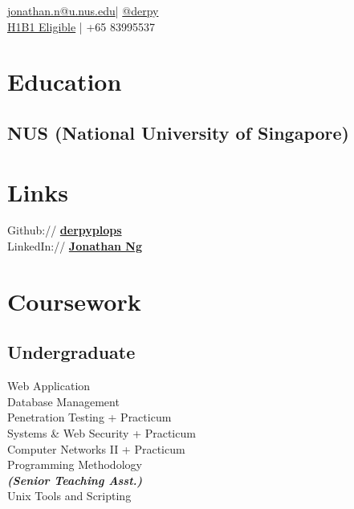 \documentclass[]{deedy-resume-openfont}
\begin{document}
%
%
\lastupdated

%
%
 { \href{mailto:jonathan.n@u.nus.edu}{jonathan.n@u.nus.edu}| \href{http://t.me/derpy/}{@derpy}\\
\href{http://www.h1b1.com/practices/h-1b1-visa-for-chileans-singaporeans/}{H1B1 Eligible}
| +65 83995537
\\
}

%
%

\begin{minipage}[t]{0.33\textwidth}


\section{Education} 

\subsection{NUS (National University of Singapore)}
\sectionsep


\section{Links} 
Github:// \href{https://github.com/derpyplops}{\bf derpyplops} \\
LinkedIn://  \href{https://www.linkedin.com/in/jonathan-ng-7061a3162/}{\bf Jonathan Ng} \\


\section{Coursework}

\subsection{Undergraduate}
Web Application \\
Database Management \\
Penetration Testing + Practicum \\
Systems \& Web Security + Practicum \\
Computer Networks II + Practicum \\
Programming Methodology \\
{\footnotesize \textit{\textbf{(Senior Teaching Asst.) }}} \\
Unix Tools and Scripting \\
\sectionsep


\end{minipage}
\end{document}

